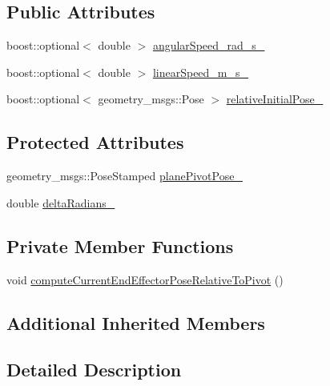 \subsection*{Public Attributes}
\begin{DoxyCompactItemize}
\item 
boost\+::optional$<$ double $>$ \hyperlink{classcl__move__group__interface_1_1CbCircularPivotMotion_a39fa383804d82285e07fa1c5a37cc587}{angular\+Speed\+\_\+rad\+\_\+s\+\_\+}
\item 
boost\+::optional$<$ double $>$ \hyperlink{classcl__move__group__interface_1_1CbCircularPivotMotion_adf6f6bc7a7a55f5c3dff80475e33c2e3}{linear\+Speed\+\_\+m\+\_\+s\+\_\+}
\item 
boost\+::optional$<$ geometry\+\_\+msgs\+::\+Pose $>$ \hyperlink{classcl__move__group__interface_1_1CbCircularPivotMotion_a1b2cc65d2f27a4dec54c20f1f00d4bb8}{relative\+Initial\+Pose\+\_\+}
\end{DoxyCompactItemize}
\subsection*{Protected Attributes}
\begin{DoxyCompactItemize}
\item 
geometry\+\_\+msgs\+::\+Pose\+Stamped \hyperlink{classcl__move__group__interface_1_1CbCircularPivotMotion_a0994efbe93b9f9a61fcf3703c360cda2}{plane\+Pivot\+Pose\+\_\+}
\item 
double \hyperlink{classcl__move__group__interface_1_1CbCircularPivotMotion_afade33f1182615c64ea972075bfd2b95}{delta\+Radians\+\_\+}
\end{DoxyCompactItemize}
\subsection*{Private Member Functions}
\begin{DoxyCompactItemize}
\item 
void \hyperlink{classcl__move__group__interface_1_1CbCircularPivotMotion_a147d7113ed686709dc2d362e56a95ad9}{compute\+Current\+End\+Effector\+Pose\+Relative\+To\+Pivot} ()
\end{DoxyCompactItemize}
\subsection*{Additional Inherited Members}


\subsection{Detailed Description}


